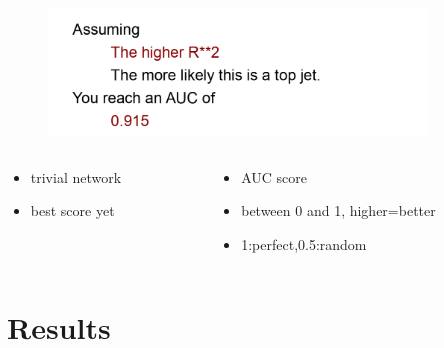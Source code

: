 \documentclass[hyperref={pdfpagelabels=false}]{beamer}
\begin{document}
\begin{frame}[label=]
\frametitle{}
\begin{figure}[H] 
  \centering
\includegraphics[width=0.9\textwidth]{../imgs/netresc}
\label{fig:netresc}
  \end{figure}


\begin{columns}[c] %
\begin{column}{0.48\textwidth}%
\begin{itemize}

    \item trivial network

    \item best score yet


\end{itemize}
\end{column}%
\hfill%
\begin{column}{0.48\textwidth}%
\begin{itemize}

    \item AUC score

    \item between 0 and 1, higher=better

    \item 1:perfect,0.5:random


\end{itemize}
\end{column}%
\hfill%
\end{columns}

\end{frame}





\newpage
\section{Results}\label{sec:Results}
\end{document}
